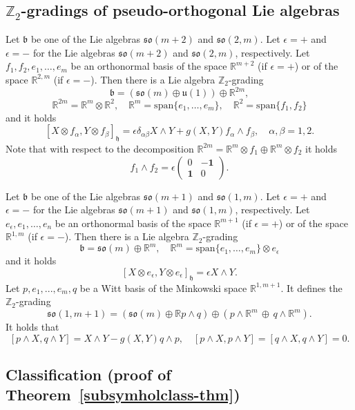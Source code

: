 \documentclass{amsart}
\theoremstyle{plain}
\theoremstyle{definition}
\def\so{\mathfrak{so}}
\def\u{\mathfrak{u}}
\newcommand{\h}{\mathfrak{h}}
\newcommand{\Real}{\mathbb{R}}
\newcommand{\1}{\mathbf{1}}
\newcommand{\+}{\oplus}
\begin{document}
\subsection{$\mathbb{Z}_2$-gradings of pseudo-orthogonal Lie algebras}
		 Let $\mathfrak{b}$ be one of the Lie algebras
	$\so(m+2)$ and $\so(2,m)$.
	Let $\epsilon=+$ and $\epsilon=-$ for the Lie algebras $\so(m+2)$ and $\so(2,m)$, respectively. Let $f_1,f_2,e_1,\dots,e_m$ be an orthonormal basis of the space $\Real^{m+2}$ (if $\epsilon=+$) or of the space $\Real^{2,m}$ (if $\epsilon=-$). Then there is a Lie algebra $\mathbb{Z}_2$-grading 
	$$\mathfrak{b}=(\so(m)\oplus\u(1))\oplus\Real^{2m},$$
	$$\Real^{2m}=\Real^m\otimes \Real^2,\quad \Real^m=\mathrm{span}\{e_1,\dots,e_m\},\quad 
	\Real^2=\mathrm{span}\{f_1,f_2\}$$ and it holds
	$$[X\otimes f_\alpha, Y\otimes f_\beta]_{\h}=\epsilon\delta_{\alpha\beta} X\wedge Y+g(X,Y) f_\alpha\wedge f_\beta,\quad \alpha,\beta=1,2.$$
	Note that with respect to the decomposition $\Real^{2m}=\Real^m\otimes f_1\oplus \Real^m\otimes f_2$ it holds
	$$f_1\wedge f_2=\epsilon \left( \begin{matrix} 0& -\1 \\ \1&0 \end{matrix}\right).$$
	
	Let $\mathfrak{b}$ be one of the Lie algebras
	$\so(m+1)$ and $\so(1,m)$.
	Let $\epsilon=+$ and $\epsilon=-$ for the Lie algebras $\so(m+1)$ and $\so(1,m)$, respectively. Let $e_\epsilon,e_1,\dots,e_n$ be an orthonormal basis of the space $\Real^{m+1}$ (if $\epsilon=+$) or of the space $\Real^{1,m}$ (if $\epsilon=-$). Then there is a Lie algebra $\mathbb{Z}_2$-grading
	$$\mathfrak{b}=\so(m)\oplus\Real^{m},\quad 
	\Real^{m}= \mathrm{span}\{e_1,\dots,e_m\}\otimes e_\epsilon$$ and it holds
	$$[X\otimes e_\epsilon, Y\otimes e_\epsilon]_{\h}=\epsilon X\wedge Y.$$
	Let $p,e_1,...,e_m,q$ be a Witt basis of the Minkowski space $\Real^{1,m+1}$. 
	It defines the $\mathbb{Z}_2$-grading
	$$\so(1,m+1)=(\so(m)\oplus\Real p\wedge q)\oplus(p\wedge \Real^m\, \oplus\, q\wedge \Real^m).$$ It holds that $$[p\wedge X, q\wedge Y]=X\wedge Y-g(X,Y) q\wedge p, \quad [p\wedge X, p\wedge Y]=[q\wedge X, q\wedge Y]=0.$$




	\subsection{Classification (proof of Theorem~\ref{subsymholclass-thm})} 	
\end{document}
